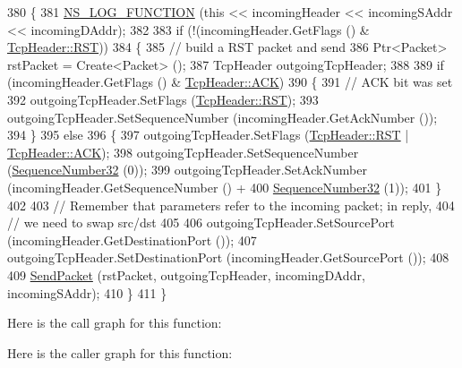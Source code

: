 \begin{DoxyCode}
380 \{
381   \hyperlink{log-macros-disabled_8h_a90b90d5bad1f39cb1b64923ea94c0761}{NS\_LOG\_FUNCTION} (\textcolor{keyword}{this} << incomingHeader << incomingSAddr << incomingDAddr);
382 
383   \textcolor{keywordflow}{if} (!(incomingHeader.GetFlags () & \hyperlink{classns3_1_1TcpHeader_a5f3d432941327854b5ad621e467479c6ace24c1738ff6e0ae9348ca913b9d10d8}{TcpHeader::RST}))
384     \{
385       \textcolor{comment}{// build a RST packet and send}
386       Ptr<Packet> rstPacket = Create<Packet> ();
387       TcpHeader outgoingTcpHeader;
388 
389       \textcolor{keywordflow}{if} (incomingHeader.GetFlags () & \hyperlink{classns3_1_1TcpHeader_a5f3d432941327854b5ad621e467479c6a1182e63050402c9f49208c62c1ec2d5c}{TcpHeader::ACK})
390         \{
391           \textcolor{comment}{// ACK bit was set}
392           outgoingTcpHeader.SetFlags (\hyperlink{classns3_1_1TcpHeader_a5f3d432941327854b5ad621e467479c6ace24c1738ff6e0ae9348ca913b9d10d8}{TcpHeader::RST});
393           outgoingTcpHeader.SetSequenceNumber (incomingHeader.GetAckNumber ());
394         \}
395       \textcolor{keywordflow}{else}
396         \{
397           outgoingTcpHeader.SetFlags (\hyperlink{classns3_1_1TcpHeader_a5f3d432941327854b5ad621e467479c6ace24c1738ff6e0ae9348ca913b9d10d8}{TcpHeader::RST} | 
      \hyperlink{classns3_1_1TcpHeader_a5f3d432941327854b5ad621e467479c6a1182e63050402c9f49208c62c1ec2d5c}{TcpHeader::ACK});
398           outgoingTcpHeader.SetSequenceNumber (\hyperlink{group__network_gacb2070e4e98d2d5135c9bede58f07a03}{SequenceNumber32} (0));
399           outgoingTcpHeader.SetAckNumber (incomingHeader.GetSequenceNumber () +
400                                           \hyperlink{group__network_gacb2070e4e98d2d5135c9bede58f07a03}{SequenceNumber32} (1));
401         \}
402 
403       \textcolor{comment}{// Remember that parameters refer to the incoming packet; in reply,}
404       \textcolor{comment}{// we need to swap src/dst}
405 
406       outgoingTcpHeader.SetSourcePort (incomingHeader.GetDestinationPort ());
407       outgoingTcpHeader.SetDestinationPort (incomingHeader.GetSourcePort ());
408 
409       \hyperlink{classns3_1_1TcpL4Protocol_a622217854cad6fdfd562f42a6731ba6c}{SendPacket} (rstPacket, outgoingTcpHeader, incomingDAddr, incomingSAddr);
410     \}
411 \}
\end{DoxyCode}


Here is the call graph for this function\+:




Here is the caller graph for this function\+:


